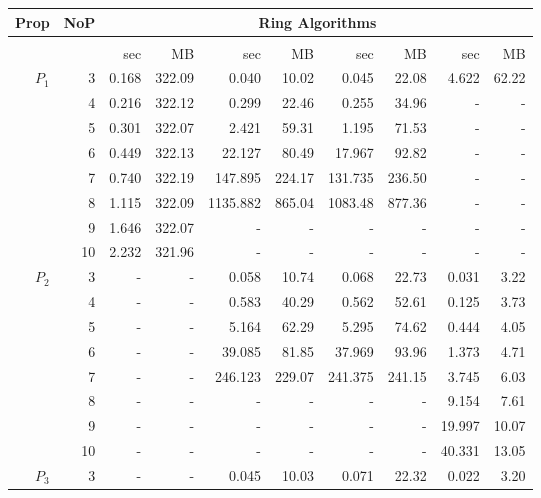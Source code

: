 \begin{table}[h!]\scriptsize
	\centering
	\setlength{\tabcolsep}{2pt}
	\begin{tabular}{| r | r | r | r | r | r | r | r | r | r |}
		\hline
		\textbf{Prop} & \textbf{NoP} & \multicolumn{8}{c|}{Ring Algorithms} \\
		\hline
		{} & {} & \multicolumn{2}{c|}{\verds{}} & \multicolumn{2}{c|}{\nusmv{}} & \multicolumn{2}{c|}{\nuxmv{}} &  \multicolumn{2}{c|}{\sctl{}} \\
		\hline
		{} & {} & sec & MB & sec & MB & sec & MB & sec & MB \\
		\hline
		\multirow{6}{*}{$P_1$} & 3 & 0.168 & 322.09 & 0.040 & 10.02 & 0.045 & 22.08 & 4.622 & 62.22  \\
		{} & 4 & 0.216 & 322.12 & 0.299 & 22.46 & 0.255 & 34.96 & - & -  \\
		{} & 5 & 0.301 & 322.07 & 2.421 & 59.31 & 1.195 & 71.53 & - & -  \\
		{} & 6 & 0.449 & 322.13 & 22.127 & 80.49 & 17.967 & 92.82 & - & -  \\
		{} & 7 & 0.740 & 322.19 & 147.895 & 224.17 & 131.735 & 236.50 & - & -  \\
		{} & 8 & 1.115 & 322.09 & 1135.882 & 865.04 & 1083.48 & 877.36 & - & -  \\
		{} & 9 & 1.646 & 322.07 & - & - & - & - & - & -  \\
		{} & 10 & 2.232 & 321.96 & - & - & - & - & - & -  \\
		\hline
		\multirow{6}{*}{$P_2$} & 3 & - & - & 0.058 & 10.74 & 0.068 & 22.73 & 0.031 & 3.22  \\
		{} & 4 & - & - & 0.583 & 40.29 & 0.562 & 52.61 & 0.125 & 3.73  \\
		{} & 5 & - & - & 5.164 & 62.29 & 5.295 & 74.62 & 0.444 & 4.05  \\
		{} & 6 & - & - & 39.085 & 81.85 & 37.969 & 93.96 & 1.373 & 4.71  \\
		{} & 7 & - & - & 246.123 & 229.07 & 241.375 & 241.15 & 3.745 & 6.03  \\
		{} & 8 & - & - & - & - & - & - & 9.154 & 7.61  \\
		{} & 9 & - & - & - & - & - & - & 19.997 & 10.07  \\
		{} & 10 & - & - & - & - & - & - & 40.331 & 13.05  \\
		\hline
		\multirow{6}{*}{$P_3$} & 3 & - & - & 0.045 & 10.03 & 0.071 & 22.32 & 0.022 & 3.20  \\

\end{tabular}
\end{table}
